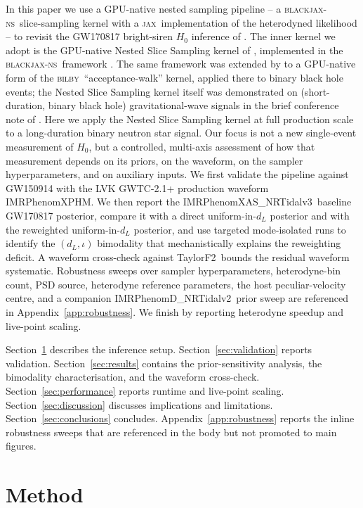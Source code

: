 \documentclass[usenatbib]{mnras}
\newcommand{\hzero}{\ensuremath{H_{0}}\xspace}
\newcommand{\dL}{\ensuremath{d_{L}}\xspace}
\newcommand{\IMR}{IMRPhenomD\_NRTidalv2\xspace}
\newcommand{\IMRX}{IMRPhenomXAS\_NRTidalv3\xspace}
\newcommand{\XPHM}{IMRPhenomXPHM\xspace}
\newcommand{\TF}{TaylorF2\xspace}
\newcommand{\bjns}{\textsc{blackjax-ns}\xspace}
\newcommand{\bilby}{\textsc{bilby}\xspace}
\newcommand{\jax}{\textsc{jax}\xspace}
\begin{document}
In this paper we use a GPU-native nested sampling pipeline -- a \bjns\ slice-sampling kernel with a \jax\ implementation of the heterodyned likelihood -- to revisit the GW170817 bright-siren \hzero inference of \citet{Abbott2017H0}. The inner kernel we adopt is the GPU-native Nested Slice Sampling kernel of \citet{Yallup2026BlackjaxNS}, implemented in the \bjns\ framework \citep{BlackJAX}. The same framework was extended by \citet{Prathaban2025GPUSpeed} to a GPU-native form of the \bilby\ ``acceptance-walk'' kernel, applied there to binary black hole events; the Nested Slice Sampling kernel itself was demonstrated on (short-duration, binary black hole) gravitational-wave signals in the brief conference note of \citet{Yallup2025BlackJAXNS}. Here we apply the Nested Slice Sampling kernel at full production scale to a long-duration binary neutron star signal. Our focus is not a new single-event measurement of \hzero, but a controlled, multi-axis assessment of how that measurement depends on its priors, on the waveform, on the sampler hyperparameters, and on auxiliary inputs. We first validate the pipeline against GW150914 with the LVK GWTC-2.1+ production waveform \XPHM \citep{Pratten2021XPHM,Abbott2021GWTC2p1}. We then report the \IMRX\ baseline GW170817 posterior, compare it with a direct uniform-in-$d_L$ posterior and with the reweighted uniform-in-$d_L$ posterior, and use targeted mode-isolated runs to identify the $(\dL,\iota)$ bimodality that mechanistically explains the reweighting deficit. A waveform cross-check against \TF\ bounds the residual waveform systematic. Robustness sweeps over sampler hyperparameters, heterodyne-bin count, PSD source, heterodyne reference parameters, the host peculiar-velocity centre, and a companion \IMR\ prior sweep are referenced in Appendix~\ref{app:robustness}. We finish by reporting heterodyne speedup and live-point scaling.

Section~\ref{sec:method} describes the inference setup. Section~\ref{sec:validation} reports validation. Section~\ref{sec:results} contains the prior-sensitivity analysis, the bimodality characterisation, and the waveform cross-check. Section~\ref{sec:performance} reports runtime and live-point scaling. Section~\ref{sec:discussion} discusses implications and limitations. Section~\ref{sec:conclusions} concludes. Appendix~\ref{app:robustness} reports the inline robustness sweeps that are referenced in the body but not promoted to main figures.

\section{Method}
\label{sec:method}
\end{document}

